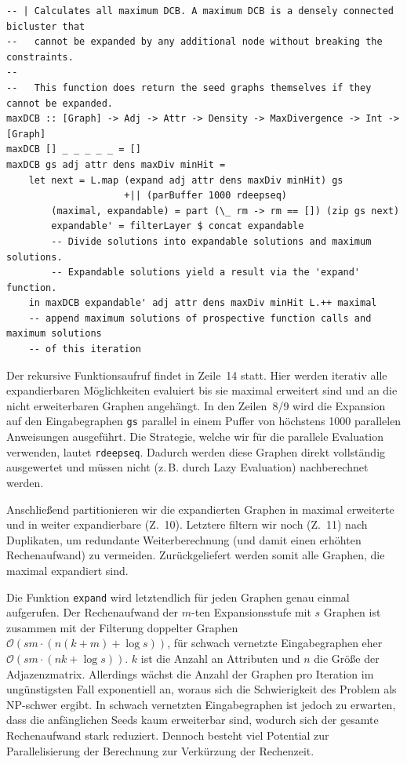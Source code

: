 \documentclass[a4paper]{scrartcl}
\begin{document}
\begin{lstlisting}[caption={Die maxDCB-Funktion},label=lst:maxDCB]
-- | Calculates all maximum DCB. A maximum DCB is a densely connected bicluster that
--   cannot be expanded by any additional node without breaking the constraints.
--   
--   This function does return the seed graphs themselves if they cannot be expanded.
maxDCB :: [Graph] -> Adj -> Attr -> Density -> MaxDivergence -> Int -> [Graph]
maxDCB [] _ _ _ _ _ = []
maxDCB gs adj attr dens maxDiv minHit =
    let next = L.map (expand adj attr dens maxDiv minHit) gs
                     +|| (parBuffer 1000 rdeepseq)
        (maximal, expandable) = part (\_ rm -> rm == []) (zip gs next)
        expandable' = filterLayer $ concat expandable
        -- Divide solutions into expandable solutions and maximum solutions.
        -- Expandable solutions yield a result via the 'expand' function.
    in maxDCB expandable' adj attr dens maxDiv minHit L.++ maximal
    -- append maximum solutions of prospective function calls and maximum solutions
    -- of this iteration
\end{lstlisting}

Der rekursive Funktionsaufruf findet in Zeile~14 statt. Hier werden iterativ alle expandierbaren Möglichkeiten evaluiert bis sie maximal erweitert sind und an die nicht erweiterbaren Graphen angehängt. In den Zeilen~8/9 wird die Expansion auf den Eingabegraphen \texttt{gs} parallel in einem Puffer von höchstens 1000 parallelen Anweisungen ausgeführt. Die Strategie, welche wir für die parallele Evaluation verwenden, lautet \texttt{rdeepseq}. Dadurch werden diese Graphen direkt vollständig ausgewertet und müssen nicht (z.\,B. durch Lazy Evaluation) nachberechnet werden.\par
\medskip
Anschließend partitionieren wir die expandierten Graphen in maximal erweiterte und in weiter expandierbare (Z.~10). Letztere filtern wir noch (Z.~11) nach Duplikaten, um redundante Weiterberechnung (und damit einen erhöhten Rechenaufwand) zu vermeiden. Zurückgeliefert werden somit alle Graphen, die maximal expandiert sind. \par
\medskip
Die Funktion \texttt{expand} wird letztendlich für jeden Graphen genau einmal aufgerufen. Der Rechenaufwand der $m$-ten Expansionsstufe mit $s$ Graphen ist zusammen mit der Filterung doppelter Graphen $\mathcal{O}(s m \cdot (n (k+m)+ \log s))$, für schwach vernetzte Eingabegraphen eher $\mathcal{O}(s m \cdot (n k + \log s))$. $k$ ist die Anzahl an Attributen und $n$ die Größe der Adjazenzmatrix. Allerdings wächst die Anzahl der Graphen pro Iteration im ungünstigsten Fall exponentiell an, woraus sich die Schwierigkeit des Problem als NP-schwer ergibt. In schwach vernetzten Eingabegraphen ist jedoch zu erwarten, dass die anfänglichen Seeds kaum erweiterbar sind, wodurch sich der gesamte Rechenaufwand stark reduziert. Dennoch besteht viel Potential zur Parallelisierung der Berechnung zur Verkürzung der Rechenzeit.
\end{document}
